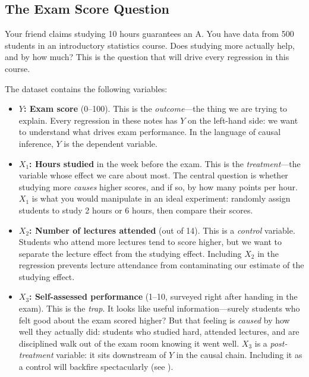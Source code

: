 \documentclass[11pt,a4paper]{article}
\theoremstyle{definition}
\theoremstyle{plain}
\theoremstyle{remark}
\begin{document}
\subsection{The Exam Score Question}

Your friend claims studying 10 hours guarantees an A. You have data from 500 students in an introductory statistics course. Does studying more actually help, and by how much? This is the question that will drive every regression in this course.

The dataset contains the following variables:

\begin{itemize}
  \item \textbf{$Y$: Exam score} (0--100).
    This is the \emph{outcome}---the thing we are trying to explain.
    Every regression in these notes has $Y$ on the left-hand side: we want to understand what drives exam performance.
    In the language of causal inference, $Y$ is the dependent variable.

  \item \textbf{$X_1$: Hours studied} in the week before the exam.
    This is the \emph{treatment}---the variable whose effect we care about most.
    The central question is whether studying more \emph{causes} higher scores, and if so, by how many points per hour.
    $X_1$ is what you would manipulate in an ideal experiment: randomly assign students to study 2 hours or 6 hours, then compare their scores.

  \item \textbf{$X_2$: Number of lectures attended} (out of 14).
    This is a \emph{control} variable.
    Students who attend more lectures tend to score higher, but we want to separate the lecture effect from the studying effect.
    Including $X_2$ in the regression prevents lecture attendance from contaminating our estimate of the studying effect.

  \item \textbf{$X_3$: Self-assessed performance} (1--10, surveyed right after handing in the exam).
    This is the \emph{trap}.
    It looks like useful information---surely students who felt good about the exam scored higher?
    But that feeling is \emph{caused} by how well they actually did: students who studied hard, attended lectures, and are disciplined walk out of the exam room knowing it went well.
    $X_3$ is a \emph{post-treatment} variable: it sits downstream of $Y$ in the causal chain.
    Including it as a control will backfire spectacularly (see ).


\end{itemize}
\end{document}
